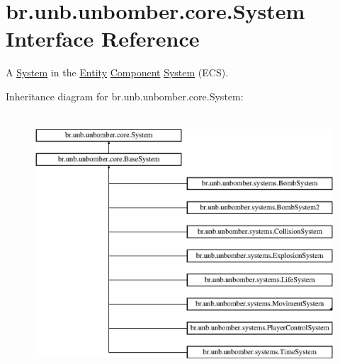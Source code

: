 \hypertarget{interfacebr_1_1unb_1_1unbomber_1_1core_1_1_system}{\section{br.\+unb.\+unbomber.\+core.\+System Interface Reference}
\label{interfacebr_1_1unb_1_1unbomber_1_1core_1_1_system}
}


A \hyperlink{interfacebr_1_1unb_1_1unbomber_1_1core_1_1_system}{System} in the \hyperlink{classbr_1_1unb_1_1unbomber_1_1core_1_1_entity}{Entity} \hyperlink{classbr_1_1unb_1_1unbomber_1_1core_1_1_component}{Component} \hyperlink{interfacebr_1_1unb_1_1unbomber_1_1core_1_1_system}{System} (E\+C\+S).  


Inheritance diagram for br.\+unb.\+unbomber.\+core.\+System\+:\begin{figure}[H]
\begin{center}
\leavevmode
\includegraphics[height=9.756097cm]{interfacebr_1_1unb_1_1unbomber_1_1core_1_1_system}
\end{center}
\end{figure}
